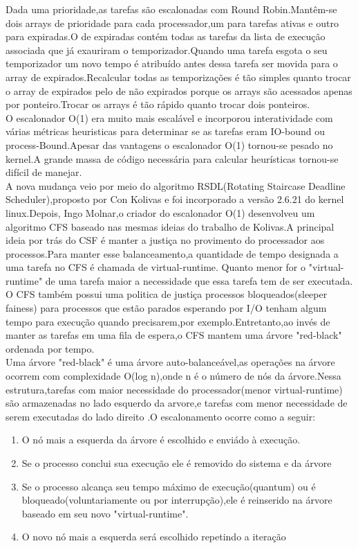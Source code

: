 \documentclass[conference]{IEEEtran}
\begin{document}
 Dada uma prioridade,as tarefas são escalonadas com Round Robin.Mantêm-se dois arrays de prioridade para cada processador,um para tarefas ativas e outro para expiradas.O de expiradas contém todas as tarefas da lista de execução associada que já exauriram o temporizador.Quando uma tarefa esgota o seu temporizador um novo tempo é atribuído antes dessa tarefa ser movida para o array de expirados.Recalcular todas as temporizações é tão simples quanto trocar o array de expirados pelo de não expirados porque os arrays são acessados apenas por ponteiro.Trocar os arrays é tão rápido quanto trocar dois ponteiros\cite{LinuxSchedulerMIT}.\\

 O escalonador O(1) era muito mais escalável e incorporou interatividade com várias métricas heuristicas para determinar se as tarefas eram IO-bound ou process-Bound.Apesar das vantagens o escalonador O(1) tornou-se pesado no kernel.A grande massa de código necessária para calcular heurísticas tornou-se difícil de manejar.\\

 A nova mudança veio por meio do algoritmo RSDL(Rotating Staircase Deadline Scheduler),proposto por Con Kolivas e foi incorporado a versão 2.6.21 do kernel linux.Depois, Ingo Molnar,o criador do escalonador O(1) desenvolveu um algoritmo CFS baseado nas mesmas ideias do trabalho de Kolivas.A principal ideia por trás do CSF é manter a justiça no provimento do processador aos processos.Para manter esse balanceamento,a quantidade de tempo designada a uma tarefa no CFS é chamada de virtual-runtime. Quanto menor for o "virtual-runtime" de uma tarefa maior a necessidade que essa tarefa tem de ser executada.\\
 
O CFS também possui uma politica de justiça processos bloqueados(sleeper fainess) para processos que estão parados esperando por I/O tenham algum tempo para execução quando precisarem,por exemplo.Entretanto,ao invés de manter as tarefas em uma fila de espera,o CFS mantem uma árvore "red-black" ordenada por tempo.\\

Uma árvore "red-black" é uma árvore auto-balanceável,as operações na árvore ocorrem com complexidade O(log n),onde n é o número de nós da árvore.Nessa estrutura,tarefas com maior necessidade do processador(menor virtual-runtime) são armazenadas no lado esquerdo da arvore,e tarefas com menor necessidade de serem executadas do lado direito \cite{LinuxSchedulerIBM}.O escalonamento ocorre como a seguir:
\begin{enumerate}
	\item O nó mais a esquerda da árvore é escolhido e enviádo à execução.
	\item Se o processo conclui sua execução ele é removido do sistema e da árvore
	\item Se o processo alcança seu tempo máximo de execução(quantum) ou é bloqueado(voluntariamente ou por interrupção),ele é reinserido na árvore baseado em seu novo "virtual-runtime".
	\item O novo nó mais a esquerda será escolhido repetindo a iteração\cite{LinuxSchedulerWiki}
\end{enumerate}
\end{document}
